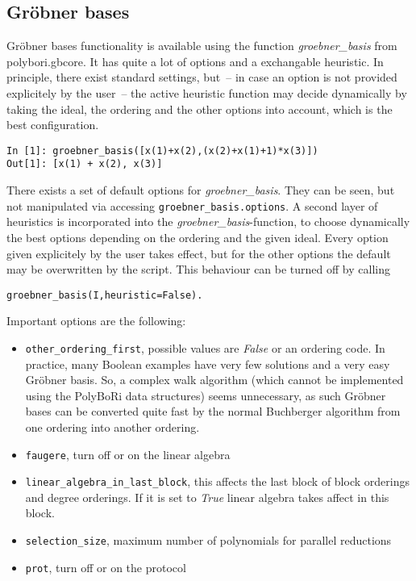 \documentclass[]{article}
\newcommand{\PolyBoRi}{{\sc PolyBoRi}\xspace}
\newcommand{\Groebner}{Gröbner\xspace}
\newcommand{\functionname}[1]{\textit{#1}\xspace}
\newcommand{\pythonconstant}[1]{\textit{#1}\xspace}
\newcounter{thm}
\begin{document}
\subsection{\Groebner bases}
\Groebner bases functionality is available using the function \functionname{groebner\_basis} from polybori.gbcore.
It has quite a lot of options and a exchangable heuristic.
In principle, there exist  standard settings, but~-- in case an option is not
provided explicitely by the user~-- the active heuristic function
may decide dynamically by taking the ideal, the ordering and the other options into account, which is the best configuration.
\begin{verbatim}
In [1]: groebner_basis([x(1)+x(2),(x(2)+x(1)+1)*x(3)])
Out[1]: [x(1) + x(2), x(3)]
\end{verbatim}

There exists a set of default options for \functionname{groebner\_basis}.
They can be seen, but not manipulated via accessing \verb|groebner_basis.options|.
A second layer of heuristics is incorporated into the \functionname{groebner\_basis}-function, to choose dynamically the best options depending on the ordering and the given ideal.
Every option given explicitely by the user takes effect, but for the other options the default may be overwritten by the script.
This behaviour can be turned off by calling
\begin{verbatim}
groebner_basis(I,heuristic=False).
\end{verbatim}

Important options are the following:
\begin{itemize}
    \item \verb|other_ordering_first|, possible values are \pythonconstant{False} or an ordering code.
    In practice, many Boolean examples have very few solutions and a very easy \Groebner basis. So, a complex walk algorithm (which cannot be implemented using the \PolyBoRi data structures) seems unnecessary, as such \Groebner bases can be converted quite fast by the 
    normal Buchberger algorithm from one ordering into another ordering.
    \item \verb|faugere|, turn off or on the linear algebra
    \item \verb|linear_algebra_in_last_block|, this affects the last block of block orderings and degree orderings. If it is set to \pythonconstant{True} linear algebra takes affect in this block.
    \item \verb|selection_size|, maximum number of polynomials for parallel reductions
    \item \verb|prot|, turn off or on the protocol
\end{itemize}
\end{document}
